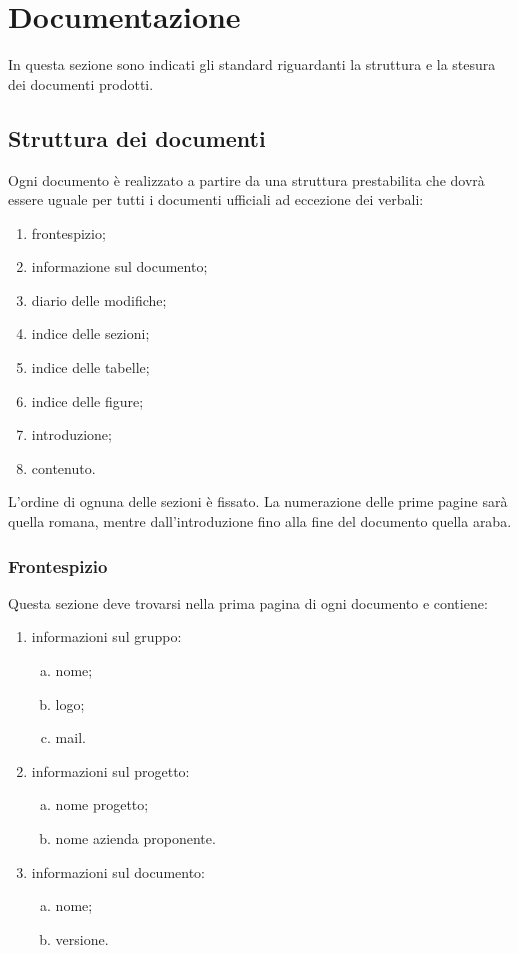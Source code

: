\documentclass[../NormeProgetto.tex]{subfiles}
\begin{document}
\section{Documentazione}
In questa sezione sono indicati gli standard riguardanti la struttura e la stesura dei documenti prodotti.

	\subsection{Struttura dei documenti}
	Ogni documento è realizzato a partire da una struttura prestabilita che dovrà essere uguale per tutti i documenti ufficiali ad eccezione dei verbali:
	\begin{enumerate}
	\item frontespizio;
	\item informazione sul documento;
	\item diario delle modifiche;
	\item indice delle sezioni;
	\item indice delle tabelle;
	\item indice delle figure;
	\item introduzione;
	\item contenuto.
	\end{enumerate}
	L'ordine di ognuna delle sezioni è fissato. La numerazione delle prime pagine sarà quella romana, mentre dall'introduzione fino alla fine del documento quella araba.

		\subsubsection{Frontespizio}
		Questa sezione deve trovarsi nella prima pagina di ogni documento e contiene:
		\begin{enumerate}
		\item informazioni sul gruppo:
			\begin{enumerate}[a.]
			\item nome;
			\item logo;
			\item mail.
			\end{enumerate}
		\item informazioni sul progetto:
			\begin{enumerate}[a.]
			\item nome progetto;
			\item nome azienda proponente.
			\end{enumerate}
		\item informazioni sul documento:
			\begin{enumerate}[a.]
			\item nome;
			\item versione.
			\end{enumerate}
		\end{enumerate}
\end{document}

